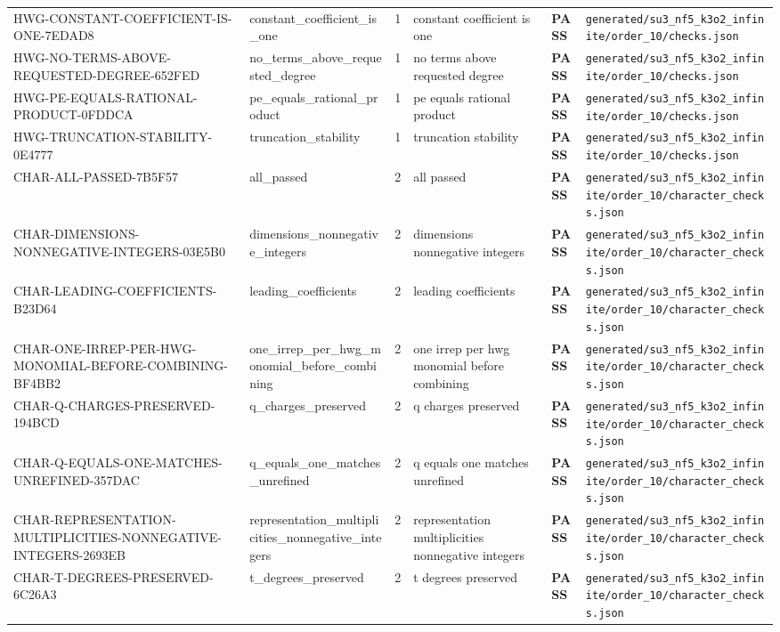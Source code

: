 \documentclass[11pt]{article}
\newcommand{\Pass}{\textcolor{green!50!black}{\textbf{PASS}}}
\newcommand{\RawPath}[1]{\texttt{#1}}
\begin{document}
\begin{longtable}{p{3cm}p{2.5cm}r p{3cm}l p{2cm}}
HWG-CONSTANT-COEFFICIENT-IS-ONE-7EDAD8 & constant\_coefficient\_is\_one & 1 & constant coefficient is one & \Pass & \RawPath{generated/su3\_nf5\_k3o2\_infinite/order\_10/checks.json}\\
HWG-NO-TERMS-ABOVE-REQUESTED-DEGREE-652FED & no\_terms\_above\_requested\_degree & 1 & no terms above requested degree & \Pass & \RawPath{generated/su3\_nf5\_k3o2\_infinite/order\_10/checks.json}\\
HWG-PE-EQUALS-RATIONAL-PRODUCT-0FDDCA & pe\_equals\_rational\_product & 1 & pe equals rational product & \Pass & \RawPath{generated/su3\_nf5\_k3o2\_infinite/order\_10/checks.json}\\
HWG-TRUNCATION-STABILITY-0E4777 & truncation\_stability & 1 & truncation stability & \Pass & \RawPath{generated/su3\_nf5\_k3o2\_infinite/order\_10/checks.json}\\
CHAR-ALL-PASSED-7B5F57 & all\_passed & 2 & all passed & \Pass & \RawPath{generated/su3\_nf5\_k3o2\_infinite/order\_10/character\_checks.json}\\
CHAR-DIMENSIONS-NONNEGATIVE-INTEGERS-03E5B0 & dimensions\_nonnegative\_integers & 2 & dimensions nonnegative integers & \Pass & \RawPath{generated/su3\_nf5\_k3o2\_infinite/order\_10/character\_checks.json}\\
CHAR-LEADING-COEFFICIENTS-B23D64 & leading\_coefficients & 2 & leading coefficients & \Pass & \RawPath{generated/su3\_nf5\_k3o2\_infinite/order\_10/character\_checks.json}\\
CHAR-ONE-IRREP-PER-HWG-MONOMIAL-BEFORE-COMBINING-BF4BB2 & one\_irrep\_per\_hwg\_monomial\_before\_combining & 2 & one irrep per hwg monomial before combining & \Pass & \RawPath{generated/su3\_nf5\_k3o2\_infinite/order\_10/character\_checks.json}\\
CHAR-Q-CHARGES-PRESERVED-194BCD & q\_charges\_preserved & 2 & q charges preserved & \Pass & \RawPath{generated/su3\_nf5\_k3o2\_infinite/order\_10/character\_checks.json}\\
CHAR-Q-EQUALS-ONE-MATCHES-UNREFINED-357DAC & q\_equals\_one\_matches\_unrefined & 2 & q equals one matches unrefined & \Pass & \RawPath{generated/su3\_nf5\_k3o2\_infinite/order\_10/character\_checks.json}\\
CHAR-REPRESENTATION-MULTIPLICITIES-NONNEGATIVE-INTEGERS-2693EB & representation\_multiplicities\_nonnegative\_integers & 2 & representation multiplicities nonnegative integers & \Pass & \RawPath{generated/su3\_nf5\_k3o2\_infinite/order\_10/character\_checks.json}\\
CHAR-T-DEGREES-PRESERVED-6C26A3 & t\_degrees\_preserved & 2 & t degrees preserved & \Pass & \RawPath{generated/su3\_nf5\_k3o2\_infinite/order\_10/character\_checks.json}\\

\end{longtable}
\end{document}
